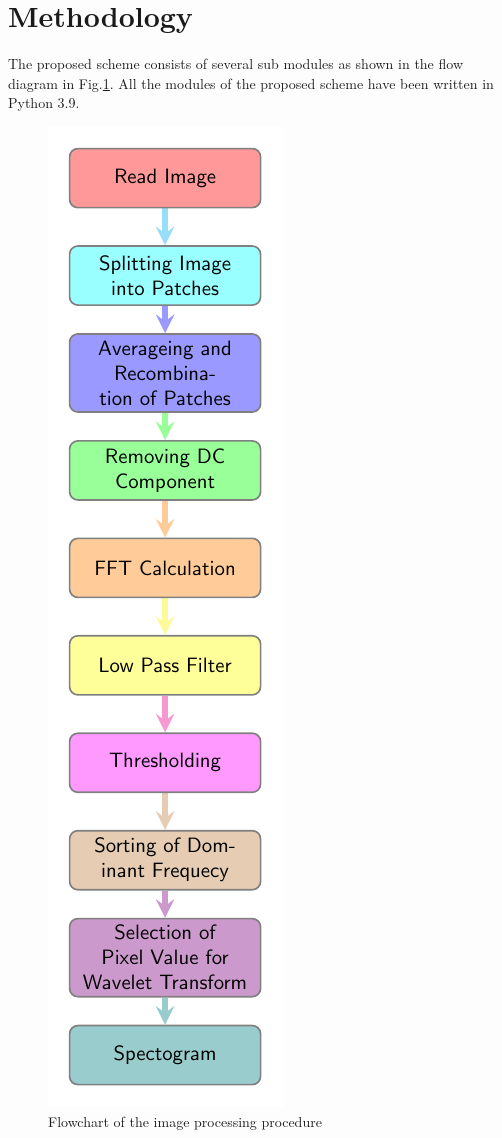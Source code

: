 \documentclass[conference]{IEEEtran}
\begin{document}
	
	\section*{Methodology}
	
	The proposed scheme consists of several sub modules as
	shown in the flow diagram in Fig.\ref{fig:k1}. All the modules of the
	proposed scheme have been written in Python 3.9.
	
	\begin{figure}[H]
		\includegraphics[scale=1.11]{plot/meth.pdf}
		\caption{Flowchart of the image processing procedure}\label{fig:k1}
			\end{figure}
	
\end{document}
